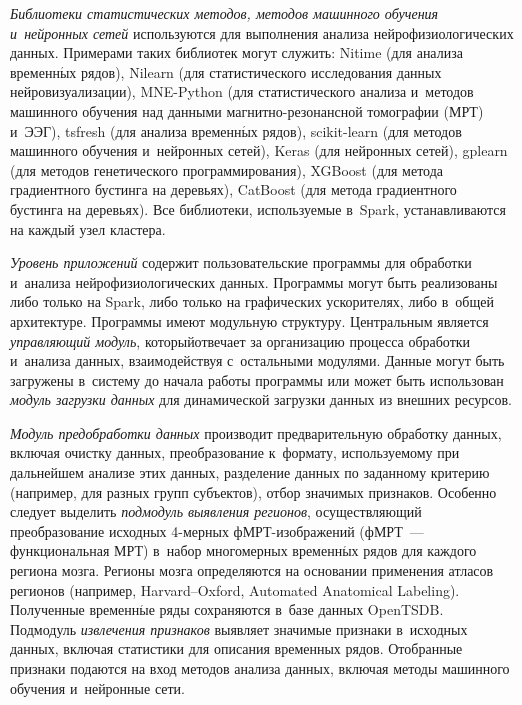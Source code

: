 \begin{multicols}{2}
    \textit{Библиотеки статистических методов, методов машинного 
обучения и~нейронных сетей} используются для выполнения анализа 
нейрофизиологических данных. Примерами таких биб\-лио\-тек могут служить: 
Nitime (для анализа вре\-мен\-н$\acute{\mbox{ы}}$х рядов), \mbox{Nilearn} (для статистического 
исследования данных нейровизуализации), MNE-Python (для статистического 
анализа и~методов машинного обуче\-ния над данными маг\-нит\-но-ре\-зо\-нанс\-ной 
томографии (МРТ) и~ЭЭГ), \mbox{tsfresh} 
(для анализа временн$\acute{\mbox{ы}}$х рядов), scikit-learn (для методов машинного 
обучения и~нейронных сетей), \mbox{Keras} (для нейронных сетей), \mbox{gplearn} (для 
методов генетического программирования), \mbox{XGBoost} (для метода 
градиентного бус\-тин\-га на деревьях), \mbox{CatBoost} (для метода градиентного 
бус\-тин\-га на деревьях). Все биб\-лио\-те\-ки, используемые в~Spark, 
устанавливаются на каж\-дый узел клас\-тера.
    
    \textit{Уровень приложений} содержит пользовательские программы для 
обработки и~анализа нейрофизиологических данных. Программы могут быть 
реализованы либо только на Spark, либо только на графических ускорителях, 
либо в~общей архитектуре. Программы имеют модульную структуру. 
Цент\-раль\-ным является \textit{управляющий модуль}, который\linebreak отвечает за 
организацию процесса обработки и~анализа данных, взаимодействуя 
с~остальными модулями. Данные могут быть загружены в~систему до начала 
работы программы или может быть использован \textit{модуль загрузки 
данных} для динамической загрузки данных из внешних ресурсов.
    
    \textit{Модуль предобработки данных} производит предварительную 
обработку данных, включая очистку данных, преобразование к~формату, 
используемому при дальнейшем анализе этих данных, разделение данных по 
заданному критерию (например, для разных групп субъектов), отбор 
значимых признаков. Особенно следует выделить \textit{подмодуль 
выявления регионов}, осуществляющий преобразование исходных 4-мер\-ных 
фМРТ-изоб\-ра\-же\-ний (фМРТ~--- функциональная  
МРТ) в~набор многомерных временн$\acute{\mbox{ы}}$х 
рядов для каждого региона мозга. Регионы мозга определяются на основании 
применения атласов регионов (например, Harvard--Oxford, Automated 
Anatomical Labeling). Полученные временн$\acute{\mbox{ы}}$е ряды сохраняются в~базе 
данных OpenTSDB. Подмодуль \textit{извлечения признаков} выявляет 
значимые признаки в~исходных данных, включая статистики для описания 
временных рядов. Отобранные признаки подаются на вход методов анализа 
данных, включая методы машинного обучения и~нейронные сети.
    

\end{multicols}
